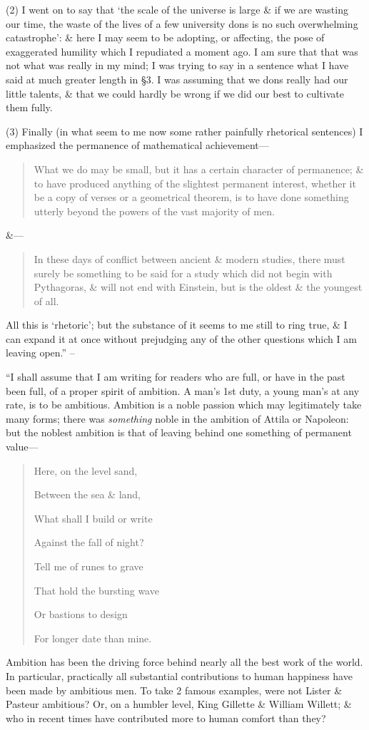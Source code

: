 \documentclass{article}
\numberwithin{equation}{section}
\begin{document}
(2) I went on to say that `the scale of the universe is large \& if we are wasting our time, the waste of the lives of a few university dons is no such overwhelming catastrophe': \& here I may seem to be adopting, or affecting, the pose of exaggerated humility which I repudiated a moment ago. I am sure that that was not what was really in my mind; I was trying to say in a sentence what I have said at much greater length in \S3. I was assuming that we dons really had our little talents, \& that we could hardly be wrong if we did our best to cultivate them fully.

(3) Finally (in what seem to me now some rather painfully rhetorical sentences) I emphasized the permanence of mathematical achievement---
\begin{quotation}
	What we do may be small, but it has a certain character of permanence; \& to have produced anything of the slightest permanent interest, whether it be a copy of verses or a geometrical theorem, is to have done something utterly beyond the powers of the vast majority of men.
\end{quotation}
\&---
\begin{quotation}
	In these days of conflict between ancient \& modern studies, there must surely be something to be said for a study which did not begin with Pythagoras, \& will not end with Einstein, but is the oldest \& the youngest of all.
\end{quotation}
All this is `rhetoric'; but the substance of it seems to me still to ring true, \& I can expand it at once without prejudging any of the other questions which I am leaving open.'' -- \cite[pp. 74--77]{Hardy1992}

 ``I shall assume that I am writing for readers who are full, or have in the past been full, of a proper spirit of ambition. A man's 1st duty, a young man's at any rate, is to be ambitious. Ambition is a noble passion which may legitimately take many forms; there was \textit{something} noble in the ambition of Attila or Napoleon: but the noblest ambition is that of leaving behind one something of permanent value---
\begin{quotation}
	Here, on the level sand,
	
	Between the sea \& land,
	
	What shall I build or write
	
	Against the fall of night?
	
	
	Tell me of runes to grave
	
	That hold the bursting wave
	
	Or bastions to design
	
	For longer date than mine.
\end{quotation}
Ambition has been the driving force behind nearly all the best work of the world. In particular, practically all substantial contributions to human happiness have been made by ambitious men. To take 2 famous examples, were not Lister \& Pasteur ambitious? Or, on a humbler level, King Gillette \& William Willett; \& who in recent times have contributed more to human comfort than they?
\end{document}
